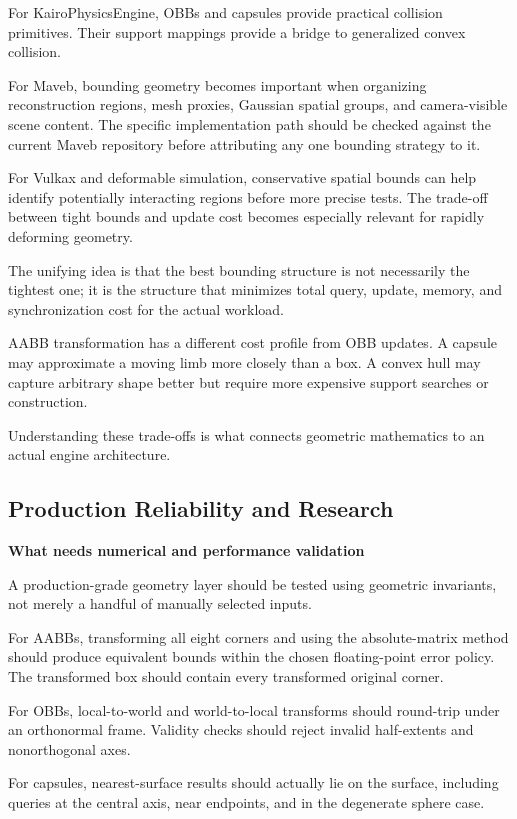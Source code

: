 For KairoPhysicsEngine, OBBs and capsules provide practical collision primitives. Their support mappings provide a bridge to generalized convex collision.

For Maveb, bounding geometry becomes important when organizing reconstruction regions, mesh proxies, Gaussian spatial groups, and camera-visible scene content. The specific implementation path should be checked against the current Maveb repository before attributing any one bounding strategy to it.

For Vulkax and deformable simulation, conservative spatial bounds can help identify potentially interacting regions before more precise tests. The trade-off between tight bounds and update cost becomes especially relevant for rapidly deforming geometry.

The unifying idea is that the best bounding structure is not necessarily the tightest one; it is the structure that minimizes total query, update, memory, and synchronization cost for the actual workload.

AABB transformation has a different cost profile from OBB updates. A capsule may approximate a moving limb more closely than a box. A convex hull may capture arbitrary shape better but require more expensive support searches or construction.

Understanding these trade-offs is what connects geometric mathematics to an actual engine architecture.

\subsection{Production Reliability and Research}\label{04-visual-computing-ii-ch022-production-reliability-and-research}

\textbf{What needs numerical and performance validation}

A production-grade geometry layer should be tested using geometric invariants, not merely a handful of manually selected inputs.

For AABBs, transforming all eight corners and using the absolute-matrix method should produce equivalent bounds within the chosen floating-point error policy. The transformed box should contain every transformed original corner.

For OBBs, local-to-world and world-to-local transforms should round-trip under an orthonormal frame. Validity checks should reject invalid half-extents and nonorthogonal axes.

For capsules, nearest-surface results should actually lie on the surface, including queries at the central axis, near endpoints, and in the degenerate sphere case.

